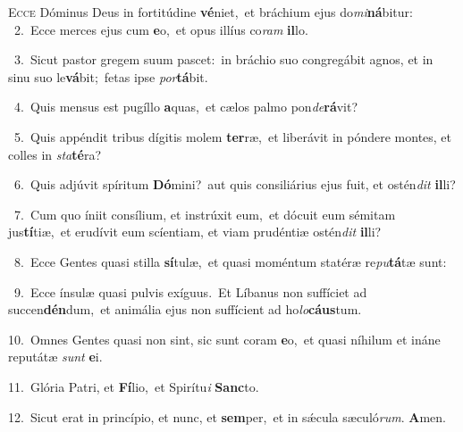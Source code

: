 \lettrine{\initial\textcolor{\initialcolor}{E}}{cce} Dóminus Deus in fortitúdine \textbf{vé}\-niet,~\star et bráchium ejus do\-\textit{mi}\-\textbf{ná}bitur:\\
{\numbfont\textcolor{\numbcolor}{~2.}}~Ecce merces ejus cum \textbf{e}\-o,~\star et opus illíus co\textit{ram} \textbf{il}\-lo.\par
{\numbfont\textcolor{\numbcolor}{~3.}}~Sicut pastor gregem suum pascet:~\dagger in bráchio suo congregábit agnos, et in sinu suo le\-\textbf{vá}\-bit;~\star fetas ipse \textit{por}\-\textbf{tá}bit.\par
{\numbfont\textcolor{\numbcolor}{~4.}}~Quis mensus est pugíllo \textbf{a}\-quas,~\star et cælos palmo pon\-\textit{de}\-\textbf{rá}vit?\par
{\numbfont\textcolor{\numbcolor}{~5.}}~Quis appéndit tribus dígitis molem \textbf{ter}\-ræ,~\star et liberávit in póndere montes, et colles in \textit{sta}\-\textbf{té}ra?\par
{\numbfont\textcolor{\numbcolor}{~6.}}~Quis adjúvit spíritum \textbf{Dó}\-mini?~\star aut quis consiliárius ejus fuit, et ostén\textit{dit} \textbf{il}\-li?\par
{\numbfont\textcolor{\numbcolor}{~7.}}~Cum quo íniit consílium, et instrúxit eum,~\dagger et dócuit eum sémitam jus\-\textbf{tí}\-tiæ,~\star et erudívit eum scíentiam, et viam prudéntiæ ostén\textit{dit} \textbf{il}\-li?\par
{\numbfont\textcolor{\numbcolor}{~8.}}~Ecce Gentes quasi stilla \textbf{sí}\-tulæ,~\star et quasi moméntum statéræ re\-\textit{pu}\-\textbf{tá}tæ sunt:\par
{\numbfont\textcolor{\numbcolor}{~9.}}~Ecce ínsulæ quasi pulvis exíguus.~\dagger Et Líbanus non suffíciet ad succen\-\textbf{dén}\-dum,~\star et animália ejus non suffícient ad ho\-\textit{lo}\-\textbf{cáus}tum.\par
{\numbfont\textcolor{\numbcolor}{10.}}~Omnes Gentes quasi non sint, sic sunt coram \textbf{e}\-o,~\star et quasi níhilum et ináne reputátæ \textit{sunt} \textbf{e}\-i.\par
{\numbfont\textcolor{\numbcolor}{11.}}~Glória Patri, et \textbf{Fí}\-lio,~\star et Spirítu\textit{i} \textbf{Sanc}\-to.\par
{\numbfont\textcolor{\numbcolor}{12.}}~Sicut erat in princípio, et nunc, et \textbf{sem}\-per,~\star et in sǽcula sæculó\-\textit{rum}\-. \textbf{A}\-men.\par

